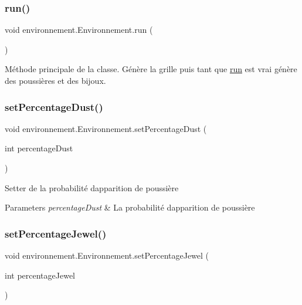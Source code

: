 \subsubsection{\texorpdfstring{run()}{run()}}
{\footnotesize\ttfamily void environnement.\+Environnement.\+run (\begin{DoxyParamCaption}{ }\end{DoxyParamCaption})}

Méthode principale de la classe. Génère la grille puis tant que \hyperlink{}{run} est vrai génère des poussières et des bijoux. \hypertarget{classenvironnement_1_1_environnement_ade3736e361839278d989c81627623b39}{}\label{classenvironnement_1_1_environnement_ade3736e361839278d989c81627623b39} 
\subsubsection{\texorpdfstring{set\+Percentage\+Dust()}{setPercentageDust()}}
{\footnotesize\ttfamily void environnement.\+Environnement.\+set\+Percentage\+Dust (\begin{DoxyParamCaption}\item[{int}]{percentage\+Dust }\end{DoxyParamCaption})}

Setter de la probabilité d\textquotesingle{}apparition de poussière 
\begin{DoxyParams}{Parameters}
{\em percentage\+Dust} & La probabilité d\textquotesingle{}apparition de poussière \\
\hline
\end{DoxyParams}
\hypertarget{classenvironnement_1_1_environnement_a9c0702025cafba8d78596edfb00e1f42}{}\label{classenvironnement_1_1_environnement_a9c0702025cafba8d78596edfb00e1f42} 
\subsubsection{\texorpdfstring{set\+Percentage\+Jewel()}{setPercentageJewel()}}
{\footnotesize\ttfamily void environnement.\+Environnement.\+set\+Percentage\+Jewel (\begin{DoxyParamCaption}\item[{int}]{percentage\+Jewel }\end{DoxyParamCaption})}

